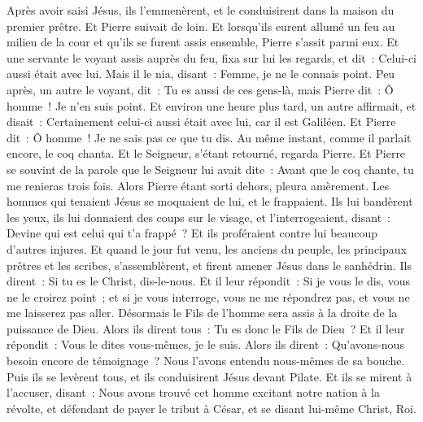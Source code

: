 \begin{multicols}{2}
Après avoir saisi Jésus, ils l'emmenèrent, et le conduisirent dans la maison du premier prêtre. Et Pierre suivait de loin.
Et lorsqu'ils eurent allumé un feu au milieu de la cour et qu'ils se furent assis ensemble, Pierre s'assit parmi eux.
Et une servante le voyant assis auprès du feu, fixa sur lui les regards, et dit~: Celui-ci aussi était avec lui.
Mais il le nia, disant~: Femme, je ne le connais point.
Peu après, un autre le voyant, dit~: Tu es aussi de ces gens-là, mais Pierre dit~: Ô homme~! Je n'en suis point.
Et environ une heure plus tard, un autre affirmait, et disait~: Certainement celui-ci aussi était avec lui, car il est Galiléen.
Et Pierre dit~: Ô homme~! Je ne sais pas ce que tu dis. Au même instant, comme il parlait encore, le coq chanta.
Et le Seigneur, s'étant retourné, regarda Pierre. Et Pierre se souvint de la parole que le Seigneur lui avait dite~: Avant que le coq chante, tu me renieras trois fois.
Alors Pierre étant sorti dehors, pleura amèrement.
Les hommes qui tenaient Jésus se moquaient de lui, et le frappaient.
Ils lui bandèrent les yeux, ils lui donnaient des coups sur le visage, et l'interrogeaient, disant~: Devine qui est celui qui t'a frappé~?
Et ils proféraient contre lui beaucoup d'autres injures.
Et quand le jour fut venu, les anciens du peuple, les principaux prêtres et les scribes, s'assemblèrent, et firent amener Jésus dans le sanhédrin.
Ils dirent~: Si tu es le Christ, dis-le-nous. Et il leur répondit~: Si je vous le dis, vous ne le croirez point~;
et si je vous interroge, vous ne me répondrez pas, et vous ne me laisserez pas aller.
Désormais le Fils de l'homme sera assis à la droite de la puissance de Dieu.
Alors ils dirent tous~: Tu es donc le Fils de Dieu~? Et il leur répondit~: Vous le dites vous-mêmes, je le suis.
Alors ils dirent~: Qu'avons-nous besoin encore de témoignage~? Nous l'avons entendu nous-mêmes de sa bouche.
\VerseOne{}Puis ils se levèrent tous, et ils conduisirent Jésus devant Pilate.
Et ils se mirent à l'accuser, disant~: Nous avons trouvé cet homme excitant notre nation à la révolte, et défendant de payer le tribut à César, et se disant lui-même Christ, Roi.

\end{multicols}

